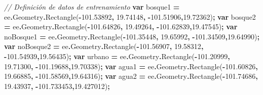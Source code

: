 \documentclass[
  12pt,
  letterpaper,
  twoside]{book}
\newenvironment{Shaded}{\begin{snugshade}}{\end{snugshade}}
\newcommand{\AttributeTok}[1]{\textcolor[rgb]{0.77,0.63,0.00}{#1}}
\newcommand{\CommentTok}[1]{\textcolor[rgb]{0.56,0.35,0.01}{\textit{#1}}}
\newcommand{\FloatTok}[1]{\textcolor[rgb]{0.00,0.00,0.81}{#1}}
\newcommand{\FunctionTok}[1]{\textcolor[rgb]{0.00,0.00,0.00}{#1}}
\newcommand{\KeywordTok}[1]{\textcolor[rgb]{0.13,0.29,0.53}{\textbf{#1}}}
\newcommand{\NormalTok}[1]{#1}
\newcommand{\OperatorTok}[1]{\textcolor[rgb]{0.81,0.36,0.00}{\textbf{#1}}}
\begin{document}
\begin{Shaded}
\begin{Highlighting}[]
\CommentTok{// Definición de datos de entrenamiento}
\KeywordTok{var}\NormalTok{ bosque1 }\OperatorTok{=}\NormalTok{ ee}\OperatorTok{.}\AttributeTok{Geometry}\OperatorTok{.}\FunctionTok{Rectangle}\NormalTok{(}\OperatorTok{{-}}\FloatTok{101.53892}\OperatorTok{,} \FloatTok{19.74148}\OperatorTok{,} 
  \OperatorTok{{-}}\FloatTok{101.51906}\OperatorTok{,}\FloatTok{19.72362}\NormalTok{)}\OperatorTok{;}
\KeywordTok{var}\NormalTok{ bosque2 }\OperatorTok{=}\NormalTok{ ee}\OperatorTok{.}\AttributeTok{Geometry}\OperatorTok{.}\FunctionTok{Rectangle}\NormalTok{(}\OperatorTok{{-}}\FloatTok{101.64826}\OperatorTok{,} \FloatTok{19.49264}\OperatorTok{,} 
  \OperatorTok{{-}}\FloatTok{101.62839}\OperatorTok{,}\FloatTok{19.47545}\NormalTok{)}\OperatorTok{;}
\KeywordTok{var}\NormalTok{ noBosque1 }\OperatorTok{=}\NormalTok{ ee}\OperatorTok{.}\AttributeTok{Geometry}\OperatorTok{.}\FunctionTok{Rectangle}\NormalTok{(}\OperatorTok{{-}}\FloatTok{101.35448}\OperatorTok{,} \FloatTok{19.65992}\OperatorTok{,} 
  \OperatorTok{{-}}\FloatTok{101.34509}\OperatorTok{,}\FloatTok{19.64990}\NormalTok{)}\OperatorTok{;}
\KeywordTok{var}\NormalTok{ noBosque2 }\OperatorTok{=}\NormalTok{ ee}\OperatorTok{.}\AttributeTok{Geometry}\OperatorTok{.}\FunctionTok{Rectangle}\NormalTok{(}\OperatorTok{{-}}\FloatTok{101.56907}\OperatorTok{,} \FloatTok{19.58312}\OperatorTok{,} 
  \OperatorTok{{-}}\FloatTok{101.54939}\OperatorTok{,}\FloatTok{19.56435}\NormalTok{)}\OperatorTok{;}
\KeywordTok{var}\NormalTok{ urbano }\OperatorTok{=}\NormalTok{ ee}\OperatorTok{.}\AttributeTok{Geometry}\OperatorTok{.}\FunctionTok{Rectangle}\NormalTok{(}\OperatorTok{{-}}\FloatTok{101.20999}\OperatorTok{,} \FloatTok{19.71300}\OperatorTok{,} 
  \OperatorTok{{-}}\FloatTok{101.19688}\OperatorTok{,}\FloatTok{19.70338}\NormalTok{)}\OperatorTok{;}
\KeywordTok{var}\NormalTok{ agua1 }\OperatorTok{=}\NormalTok{ ee}\OperatorTok{.}\AttributeTok{Geometry}\OperatorTok{.}\FunctionTok{Rectangle}\NormalTok{(}\OperatorTok{{-}}\FloatTok{101.60826}\OperatorTok{,} \FloatTok{19.66885}\OperatorTok{,} 
  \OperatorTok{{-}}\FloatTok{101.58569}\OperatorTok{,}\FloatTok{19.64316}\NormalTok{)}\OperatorTok{;}
\KeywordTok{var}\NormalTok{ agua2 }\OperatorTok{=}\NormalTok{ ee}\OperatorTok{.}\AttributeTok{Geometry}\OperatorTok{.}\FunctionTok{Rectangle}\NormalTok{(}\OperatorTok{{-}}\FloatTok{101.74686}\OperatorTok{,} \FloatTok{19.43937}\OperatorTok{,} 
  \OperatorTok{{-}}\FloatTok{101.733453}\OperatorTok{,}\FloatTok{19.427012}\NormalTok{)}\OperatorTok{;}


\end{Highlighting}
\end{Shaded}
\end{document}
